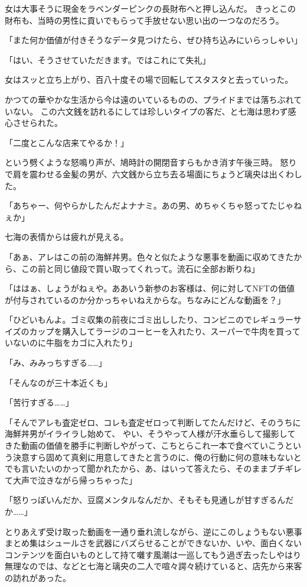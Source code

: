 女は大事そうに現金をラベンダーピンクの長財布へと押し込んだ。
きっとこの財布も、当時の男性に貢いでもらって手放せない思い出の一つなのだろう。

「また何か価値が付きそうなデータ見つけたら、ぜひ持ち込みにいらっしゃい」

「はい、そうさせていただきます。ではこれにて失礼」

女はスッと立ち上がり、百八十度その場で回転してスタスタと去っていった。

かつての華やかな生活から今は遠のいているものの、プライドまでは落ちぶれていない。
この六文銭を訪れるにしては珍しいタイプの客だ、と七海は思わず感心させられた。

\sectionbreak

「二度とこんな店来てやるか！」

という劈くような怒鳴り声が、鳩時計の開閉音すらもかき消す午後三時。
怒りで肩を震わせる金髪の男が、六文銭から立ち去る場面にちょうど璃央は出くわした。

「あちゃー、何やらかしたんだよナナミ。あの男、めちゃくちゃ怒ってたじゃねぇか」

七海の表情からは疲れが見える。

「あぁ、アレはこの前の海鮮丼男。色々と似たような悪事を動画に収めてきたから、この前と同じ値段で買い取ってくれって。流石に全部お断りね」

「ははぁ、しょうがねぇや。ああいう新参のお客様は、何に対してNFTの価値が付与されているのか分かっちゃいねえからな。ちなみにどんな動画を？」

「ひどいもんよ。ゴミ収集の前夜にゴミ出ししたり、コンビニのでレギュラーサイズのカップを購入してラージのコーヒーを入れたり、スーパーで牛肉を買っていないのに牛脂をカゴに入れたり」

「み、みみっちすぎる……」

「そんなのが三十本近くも」

「苦行すぎる……」

「そんでアレも査定ゼロ、コレも査定ゼロって判断してたんだけど、そのうちに海鮮丼男がイライラし始めて、
やい、そうやって人様が汗水垂らして撮影してきた動画の価値を勝手に判断しやがって、こちとらこれ一本で食べていこうという決意すら固めて真剣に用意してきたと言うのに、俺の行動に何の意味もないとでも言いたいのかって聞かれたから、あ、はいって答えたら、そのままブチギレて大声で泣きながら帰っちゃった」

「怒りっぽいんだか、豆腐メンタルなんだか、そもそも見通しが甘すぎるんだか……」

とりあえず受け取った動画を一通り垂れ流しながら、逆にこのしょうもない悪事まとめ集はシュールさを武器にバズらせることができないか、いや、面白くないコンテンツを面白いものとして持て囃す風潮は一巡してもう過ぎ去ったしやはり無理なのでは、などと七海と璃央の二人で喧々諤々続けていると、店先から来客の訪れがあった。

